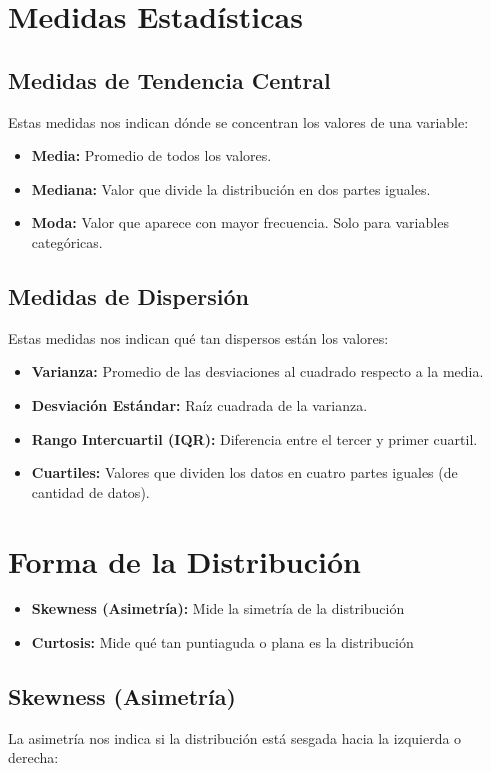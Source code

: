 \documentclass[12pt]{article}
\begin{document}
\section{Medidas Estadísticas}
\subsection{Medidas de Tendencia Central}
Estas medidas nos indican dónde se concentran los valores de una variable:

\begin{itemize}
    \item \textbf{Media:} Promedio de todos los valores.
    \item \textbf{Mediana:} Valor que divide la distribución en dos partes iguales.
    \item \textbf{Moda:} Valor que aparece con mayor frecuencia. Solo para variables categóricas.
\end{itemize}

\subsection{Medidas de Dispersión}
Estas medidas nos indican qué tan dispersos están los valores:

\begin{itemize}
    \item \textbf{Varianza:} Promedio de las desviaciones al cuadrado respecto a la media.
    \item \textbf{Desviación Estándar:} Raíz cuadrada de la varianza.
    \item \textbf{Rango Intercuartil (IQR):} Diferencia entre el tercer y primer cuartil.
    \item \textbf{Cuartiles:} Valores que dividen los datos en cuatro partes iguales (de cantidad de datos).
\end{itemize}

\section{Forma de la Distribución}
\begin{itemize}
    \item \textbf{Skewness (Asimetría):} Mide la simetría de la distribución
    \item \textbf{Curtosis:} Mide qué tan puntiaguda o plana es la distribución
\end{itemize}

\subsection{Skewness (Asimetría)}
La asimetría nos indica si la distribución está sesgada hacia la izquierda o derecha:
\end{document}
